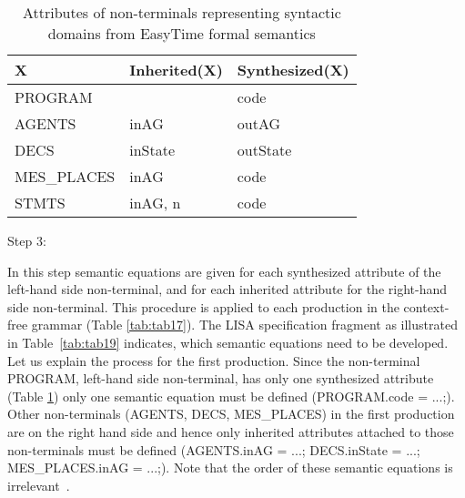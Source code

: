 \documentclass[preprint, prX]{revtex4}
\begin{document}
\begin{table}[htb]           \caption{Attributes of non-terminals representing syntactic domains from EasyTime formal semantics}
\label{tab:tab18}
\vspace{-5mm}
\footnotesize
\begin{center}
\begin{tabular}{ | l | l | l | }
\hline
X          &   Inherited(X)      &   Synthesized(X)\\
\hline
PROGRAM    &          &       code\\
AGENTS     &   inAG              &      outAG\\
DECS       &   inState           &      outState\\
MES\_PLACES &   inAG              &      code\\
STMTS      &   inAG, n           &      code\\
\hline
\end{tabular}
\end{center}
\normalsize
\vspace{-5mm}
\end{table}

Step 3:

In this step semantic equations are given for each synthesized attribute of the left-hand side non-terminal, and for each inherited attribute for the right-hand side non-terminal. This procedure is applied to each production in the context-free grammar (Table \ref{tab:tab17}). The LISA specification fragment as illustrated in Table~\ref{tab:tab19} indicates, which semantic equations need to be developed. Let us explain the process for the first production. Since the non-terminal PROGRAM, left-hand side non-terminal, has only one synthesized attribute  (Table \ref{tab:tab18}) only one semantic equation must be defined (PROGRAM.code = ...;). Other non-terminals (AGENTS, DECS, MES\_PLACES) in the first production are on the right hand side and hence only inherited attributes attached to those non-terminals must be defined (AGENTS.inAG = ...; DECS.\-inState = ...; MES\_\-PLACES.\-inAG = ...;). Note that the order of these semantic equations is irrelevant~\cite{Knuth:1968,Paakki:1995}.
\end{document}
